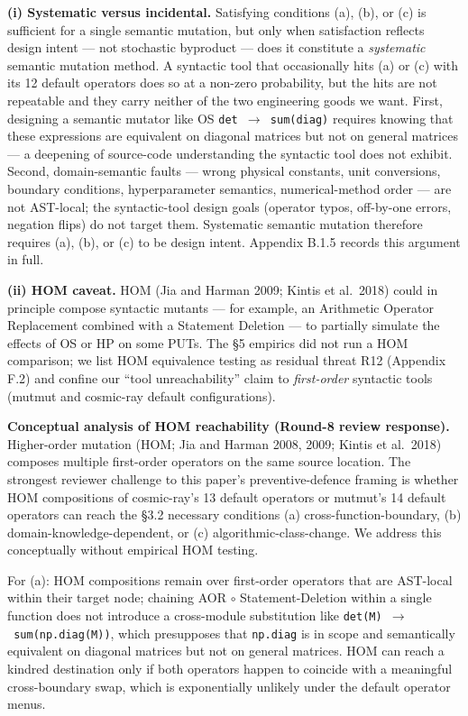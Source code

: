 \documentclass[review,12pt,authoryear]{elsarticle}
\begin{document}
\textbf{(i) Systematic versus incidental.} Satisfying conditions (a),
(b), or (c) is sufficient for a single semantic mutation, but only when
satisfaction reflects design intent --- not stochastic byproduct ---
does it constitute a \emph{systematic} semantic mutation method. A
syntactic tool that occasionally hits (a) or (c) with its 12 default
operators does so at a non-zero probability, but the hits are not
repeatable and they carry neither of the two engineering goods we want.
First, designing a semantic mutator like OS \texttt{det\ $\to$\ sum(diag)}
requires knowing that these expressions are equivalent on diagonal
matrices but not on general matrices --- a deepening of source-code
understanding the syntactic tool does not exhibit. Second,
domain-semantic faults --- wrong physical constants, unit conversions,
boundary conditions, hyperparameter semantics, numerical-method order
--- are not AST-local; the syntactic-tool design goals (operator typos,
off-by-one errors, negation flips) do not target them. Systematic
semantic mutation therefore requires (a), (b), or (c) to be design
intent. Appendix B.1.5 records this argument in full.

\textbf{(ii) HOM caveat.} HOM (Jia and Harman 2009; Kintis et al.~2018)
could in principle compose syntactic mutants --- for example, an
Arithmetic Operator Replacement combined with a Statement Deletion ---
to partially simulate the effects of OS or HP on some PUTs. The §5
empirics did not run a HOM comparison; we list HOM equivalence testing
as residual threat R12 (Appendix F.2) and confine our ``tool
unreachability'' claim to \emph{first-order} syntactic tools (mutmut and
cosmic-ray default configurations).

\textbf{Conceptual analysis of HOM reachability (Round-8 review
response).} Higher-order mutation (HOM; Jia and Harman 2008, 2009;
Kintis et al.~2018) composes multiple first-order operators on the same
source location. The strongest reviewer challenge to this paper's
preventive-defence framing is whether HOM compositions of cosmic-ray's
13 default operators or mutmut's 14 default operators can reach the §3.2
necessary conditions (a) cross-function-boundary, (b)
domain-knowledge-dependent, or (c) algorithmic-class-change. We address
this conceptually without empirical HOM testing.

For (a): HOM compositions remain over first-order operators that are
AST-local within their target node; chaining AOR $\circ$ Statement-Deletion
within a single function does not introduce a cross-module substitution
like \texttt{det(M)\ $\to$\ sum(np.diag(M))}, which presupposes that
\texttt{np.diag} is in scope and semantically equivalent on diagonal
matrices but not on general matrices. HOM can reach a kindred
destination only if both operators happen to coincide with a meaningful
cross-boundary swap, which is exponentially unlikely under the default
operator menus.
\end{document}
